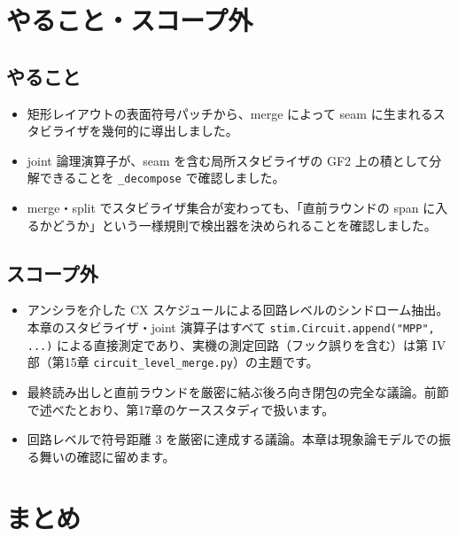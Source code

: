 \section{やること・スコープ外}\label{ch10:scope}

\subsection{やること}

\begin{itemize}
  \item 矩形レイアウトの表面符号パッチから、merge によって seam に生まれるスタビライザを幾何的に導出しました。
  \item joint 論理演算子が、seam を含む局所スタビライザの GF2 上の積として分解できることを \texttt{\_decompose} で確認しました。
  \item merge・split でスタビライザ集合が変わっても、「直前ラウンドの span に入るかどうか」という一様規則で検出器を決められることを確認しました。
\end{itemize}

\subsection{スコープ外}

\begin{itemize}
  \item アンシラを介した CX スケジュールによる回路レベルのシンドローム抽出。本章のスタビライザ・joint 演算子はすべて \texttt{stim.Circuit.append("MPP", ...)} による直接測定であり、実機の測定回路（フック誤りを含む）は第 IV 部（第15章 \texttt{circuit\_level\_merge.py}）の主題です。
  \item 最終読み出しと直前ラウンドを厳密に結ぶ後ろ向き閉包の完全な議論。前節で述べたとおり、第17章のケーススタディで扱います。
  \item 回路レベルで符号距離 3 を厳密に達成する議論。本章は現象論モデルでの振る舞いの確認に留めます。
\end{itemize}

\section{まとめ}\label{ch10:summary}

